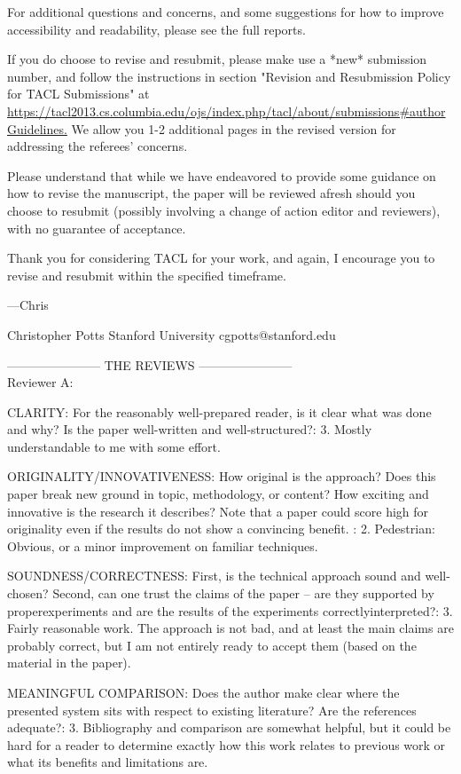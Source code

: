 \documentclass[10pt,a4paper]{letter}
\begin{document}
For additional questions and concerns, and some suggestions for how to
improve accessibility and readability, please see the full reports.

If you do choose to revise and resubmit, please make use a *new* submission
number, and follow the instructions in section "Revision and Resubmission
Policy for TACL Submissions" at
\url{https://tacl2013.cs.columbia.edu/ojs/index.php/tacl/about/submissions#authorGuidelines.}
We  allow you 1-2 additional pages in the revised version for addressing the
referees' concerns.

Please understand that while we have endeavored to provide some guidance on
how to revise the manuscript, the paper will be reviewed afresh should you
choose to resubmit (possibly involving a change of action editor and
reviewers), with no guarantee of acceptance.

Thank you for considering TACL for your work, and again, I encourage you to
revise and resubmit within the specified timeframe.

---Chris

Christopher Potts
Stanford University
cgpotts@stanford.edu

-----------------------
THE REVIEWS
----------------------- \\
Reviewer A:

CLARITY: For the reasonably well-prepared reader, is it clear what was done
and why? Is the paper well-written and well-structured?:
        3. Mostly understandable to me with some effort.


ORIGINALITY/INNOVATIVENESS: How original is the approach? Does this paper
break new ground in topic, methodology, or content? How exciting and
innovative is the research it describes?
Note that a paper could score high for originality even if the results do
not show a convincing benefit.
:
        2. Pedestrian: Obvious, or a minor improvement on familiar techniques.

SOUNDNESS/CORRECTNESS: First, is the technical approach sound and
well-chosen? Second, can one trust the claims of the paper -- are they
supported by properexperiments and are the results of the experiments
correctlyinterpreted?:
        3. Fairly reasonable work. The approach is not bad, and at least the main
claims are probably correct, but I am not entirely ready to accept them
(based on the material in the paper).

MEANINGFUL COMPARISON: Does the author make clear where the presented system
sits with respect to existing literature? Are the references adequate?:
        3. Bibliography and comparison are somewhat helpful, but it could be hard
for a reader to determine exactly how this work relates to previous work or
what its benefits and limitations are.
\end{document}
